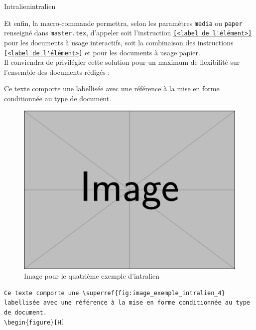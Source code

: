 \documentclass[a4paper, 11pt, twoside, fleqn]{memoir}
\begin{document}
\begin{exemple}{Intralien}{intralien}
	
Et enfin, la macro-commande \texttt{} permettra, selon les paramètres \texttt{media} ou \texttt{paper} renseigné dans \texttt{master.tex}, d'appeler soit l'instruction \texttt{\autoref{<label de l'élément>}} pour les documents à usage interactifs, soit la combinaison des instructions  \texttt{\autoref{<label de l'élément>}} et  \texttt{} pour les documents à usage papier.\\
Il conviendra de privilégier cette solution pour un maximum de flexibilité sur l'ensemble des documents rédigés :\\

\begin{minipage}[t]{0.49\linewidth}
	Ce texte comporte une  labellisée avec une référence à la mise en forme conditionnée au type de document.
	\begin{figure}[H]
	\includegraphics[width=\linewidth]{fig_image.png} 
	\caption{Image pour le quatrième exemple d'intralien\label{fig:image_exemple_intralien_4}}
	\end{figure}
\end{minipage}
	\hfill
\begin{minipage}[t]{0.49\linewidth}
	\begin{verbatim}
Ce texte comporte une \superref{fig:image_exemple_intralien_4} labellisée avec une référence à la mise en forme conditionnée au type de document.
\begin{figure}[H]

\end{verbatim}
\end{minipage}
\end{exemple}
\end{document}
